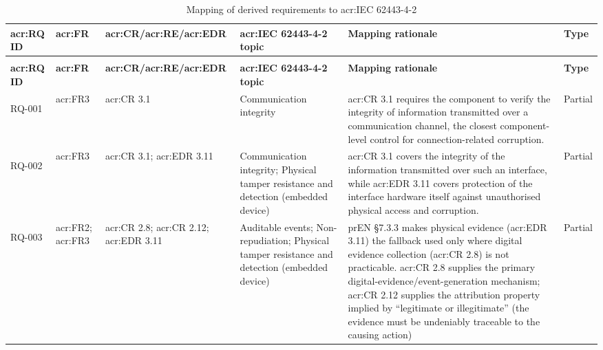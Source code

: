 \footnotesize
\begin{longtable}{|>{\bfseries}p{1.0cm}|p{0.9cm}|p{2.4cm}|p{2.4cm}|p{4.8cm}|p{1.8cm}|}
	\caption{Mapping of derived requirements to \gls{acr:IEC} 62443-4-2} 
	\label{tab:mvo-pren-iec62443-mapping} \\
	\hline
	\textbf{\gls{acr:RQ} ID} & \textbf{\gls{acr:FR}} & \textbf{\gls{acr:CR}/\gls{acr:RE}/\gls{acr:EDR}} & \textbf{\gls{acr:IEC} 62443-4-2 topic} & \textbf{Mapping rationale} & \textbf{Type} \\
	\hline
	\endfirsthead
	
	\multicolumn{6}{c}{\tablename\ \thetable{} continued from previous page} \\
	\hline
	\textbf{\gls{acr:RQ} ID} & \textbf{\gls{acr:FR}} & \textbf{\gls{acr:CR}/\gls{acr:RE}/\gls{acr:EDR}} & \textbf{\gls{acr:IEC} 62443-4-2 topic} & \textbf{Mapping rationale} & \textbf{Type} \\
	\hline
	\endhead
	
	
	\hline
	\endlastfoot
	
	RQ-001 &
	\gls{acr:FR}3 &
	\gls{acr:CR} 3.1 &
	Communication integrity &
	\gls{acr:CR} 3.1 requires the component to verify the integrity of information transmitted over a communication channel, the closest component-level control for connection-related corruption. &
	Partial \\
	\hline
	
	RQ-002 &
	\gls{acr:FR}3 &
	\gls{acr:CR} 3.1; \newline \gls{acr:EDR} 3.11 &
	Communication integrity; Physical tamper resistance and detection (embedded device) &
	\gls{acr:CR} 3.1 covers the integrity of the information transmitted over such an interface, while \gls{acr:EDR} 3.11 covers protection of the interface hardware itself against unauthorised physical access and corruption. &
	Partial \\
	\hline
	
	RQ-003 &
	\gls{acr:FR}2; \gls{acr:FR}3 &
	\gls{acr:CR} 2.8; \newline \gls{acr:CR} 2.12; \newline \gls{acr:EDR} 3.11 &
	Auditable events; Non-repudiation; Physical tamper resistance and detection (embedded device) &
	prEN \S7.3.3 makes physical evidence (\gls{acr:EDR} 3.11) the fallback used only where digital evidence collection (\gls{acr:CR} 2.8) is not practicable. \gls{acr:CR} 2.8 supplies the primary digital-evidence/event-generation mechanism; \gls{acr:CR} 2.12 supplies the attribution property implied by ``legitimate or illegitimate'' (the evidence must be undeniably traceable to the causing action) &
	Partial \\
	\hline
	

\end{longtable}
